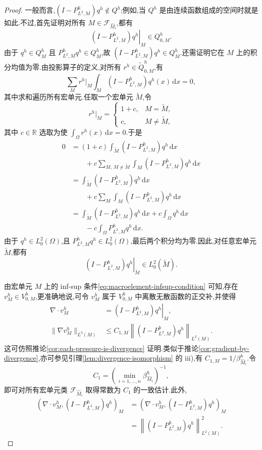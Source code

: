 \begin{proof}
一般而言,$(I-P_{L^2,M}^h)q^h\notin Q^h$;例如,当 $Q^h$ 是由连续函数组成的空间时就是如此.不过,首先证明对所有 $M\in\mathcal{F}_{\widehat M_i}$,都有
\[
  \left.(I-P_{L^2,M}^h)q^h\right|_M\in Q_{0,M}^h.
\]
由于 $q^h\in Q_M^h$ 且 $P_{L^2,M}^h q^h\in Q_M^h$,故 $(I-P_{L^2,M}^h)q^h\in Q_M^h$.还需证明它在 $M$ 上的积分均值为零.由投影算子的定义,对所有 $r^h\in\widetilde Q_{0,M}^h$,有
\[
  \sum_M r^h|_M\int_M
       (I-P_{L^2,M}^h)q^h(x)\,\mathrm{d}x=0,
\]
其中求和遍历所有宏单元.任取一个宏单元 $\widetilde M$,令
\[
  r^h|_M=
  \begin{cases}
    1+c,&M=\widetilde M,\\
    c,&M\ne\widetilde M,
  \end{cases}
\]
其中 $c\in\mathbb{R}$ 选取为使 $\int_\Omega r^h(x)\,\mathrm{d}x=0$.于是
\[
\begin{aligned}
  0
  &=(1+c)\int_{\widetilde M}(I-P_{L^2,M}^h)q^h\,\mathrm{d}x\\
  &\qquad+c\sum_{M,\,M\ne\widetilde M}
       \int_M(I-P_{L^2,M}^h)q^h\,\mathrm{d}x\\
  &=\int_{\widetilde M}(I-P_{L^2,M}^h)q^h\,\mathrm{d}x\\
  &\qquad+c\sum_M\int_M(I-P_{L^2,M}^h)q^h\,\mathrm{d}x\\
  &=\int_{\widetilde M}(I-P_{L^2,M}^h)q^h\,\mathrm{d}x
    +c\int_\Omega q^h\,\mathrm{d}x\\
  &\qquad-c\int_\Omega P_{L^2,M}^h q^h\,\mathrm{d}x.
\end{aligned}
\]
由于 $q^h\in L_0^2(\Omega)$,且 $P_{L^2,M}^h q^h\in L_0^2(\Omega)$,最后两个积分均为零.因此,对任意宏单元 $\widetilde M$,都有
\[
  \left.(I-P_{L^2,M}^h)q^h\right|_{\widetilde M}
  \in L_0^2(\widetilde M).
\]

由宏单元 $M$ 上的 inf-sup 条件\cref{eq:macroelement-infsup-condition} 可知,存在 $v_M^h\in V_{0,M}^h$,更准确地说,可令 $v_M^h$ 属于 $V_{0,M}^h$ 中离散无散函数的正交补,并使得
\[
\begin{aligned}
  \nabla\cdot v_M^h
  &=\left.(I-P_{L^2,M}^h)q^h\right|_M,\\
  \|\nabla v_M^h\|_{L^2(M)}
  &\le C_{1,M}
      \left\|(I-P_{L^2,M}^h)q^h\right\|_{L^2(M)}.
\end{aligned}
\]
这可仿照推论\ref{cor:each-pressure-is-divergence} 证明.类似于推论\ref{cor:gradient-by-divergence},亦可参见引理\ref{lem:divergence-isomorphism} 的 iii),有 $C_{1,M}=1/\beta_{\widehat M_i}^h$.令
\[
  C_1=\left(\min_{i=1,\ldots,n}\beta_{\widehat M_i}^h\right)^{-1},
\]
即可对所有宏单元类 $\mathcal{F}_{\widehat M_i}$ 取得常数为 $C_1$ 的一致估计.此外,
\[
\begin{aligned}
  (\nabla\cdot v_M^h,(I-P_{L^2,M}^h)q^h)_M
  &=\left(\nabla\cdot v_M^h,
       (I-P_{L^2,M}^h)q^h\right)_M\\
  &=\left\|(I-P_{L^2,M}^h)q^h\right\|_{L^2(M)}^2.
\end{aligned}
\]


\end{proof}
